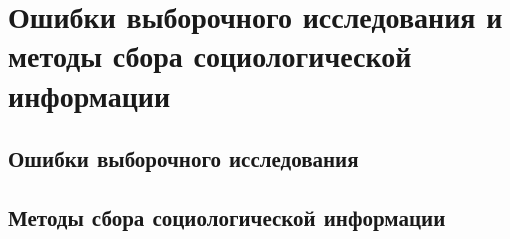 \chapter{Ошибки выборочного исследования и методы сбора социологической
  информации}
\section{Ошибки выборочного исследования}

\section{Методы сбора социологической информации}

